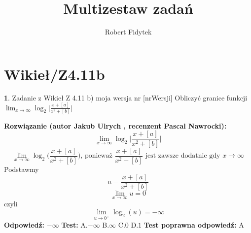 \documentclass[12pt, a4paper]{article}
\title{Multizestaw zadań}
\author{Robert Fidytek}
\date{}
\theoremstyle{definition} %
\newtheorem{zad}{}
\newcommand{\kategoria}[1]{\section{#1}} %
\newcommand{\zadStart}[1]{\begin{zad}#1\newline} %
\newcommand{\zadStop}{\end{zad}}   %
\newcommand{\rozwStart}[2]{\noindent \textbf{Rozwiązanie (autor #1 , recenzent #2): }\newline} %
\newcommand{\odpStart}{\noindent \textbf{Odpowiedź:}\newline}    %
\newcommand{\odpStop}{\newline}                                             %
\newcommand{\testStart}{\noindent \textbf{Test:}\newline} %
\newcommand{\testStop}{\newline} %
\newcommand{\kluczStart}{\noindent \textbf{Test poprawna odpowiedź:}\newline} %
\newcommand{\kluczStop}{\newline} %
\begin{document}
\maketitle


\kategoria{Wikieł/Z4.11b}
\zadStart{Zadanie z Wikieł Z 4.11 b) moja wersja nr [nrWersji]}
Obliczyć granice funkcji $\lim_{x \to \infty}\log_{2}\bigg|\frac{x+[a]}{x^{2}+[b]}\bigg|$
\zadStop
\rozwStart{Jakub Ulrych}{Pascal Nawrocki}
$$\lim_{x \to \infty}\log_{2}\bigg|\frac{x+[a]}{x^{2}+[b]}\bigg|$$
$$\lim_{x \to \infty}\log_{2}\bigg(\frac{x+[a]}{x^{2}+[b]}\bigg)\text{, ponieważ }\frac{x+[a]}{x^{2}+[b]}\text{ jest zawsze dodatnie gdy }x\to\infty$$
Podstawmy $$u=\frac{x+[a]}{x^{2}+[b]}$$
$$\lim_{x \to \infty}u=0$$
czyli
$$\lim_{u \to 0^{+}}\log_{2}(u)=-\infty$$
\odpStart
$-\infty$
\odpStop
\testStart
A.$-\infty$
B.$\infty$
C.$0$
D.$1$
\testStop
\kluczStart
A
\kluczStop
\end{document}
